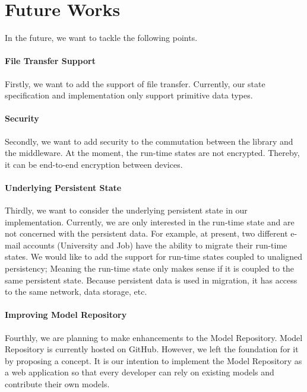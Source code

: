 \newpage
\section {Future Works}
In the future, we want to tackle the following points. 
\paragraph{File Transfer Support}
Firstly, we want to add the support of file transfer. Currently, our state specification and implementation only support primitive data types.

\paragraph{Security}
Secondly, we want to add security to the commutation between the library and the middleware. At the moment, the run-time states are not encrypted. Thereby, it can be end-to-end encryption between devices.

\paragraph{Underlying Persistent State}
Thirdly, we want to consider the underlying persistent state in our implementation. Currently, we are only interested in the run-time state and are not concerned with the persistent data.
For example, at present, two different e-mail accounts (University and Job) have the ability to migrate their run-time states. We would like to add the support for run-time states coupled to unaligned persistency; Meaning the run-time state only makes sense if it is coupled to the same persistent state. Because persistent data is used in migration, it has access to the same network, data storage, etc.

\paragraph{Improving Model Repository}
Fourthly, we are planning to make enhancements to the Model Repository. Model Repository is currently hosted on GitHub. However, we left the foundation for it by proposing a concept. It is our intention to implement the Model Repository as a web application so that every developer can rely on existing models and contribute their own models.

